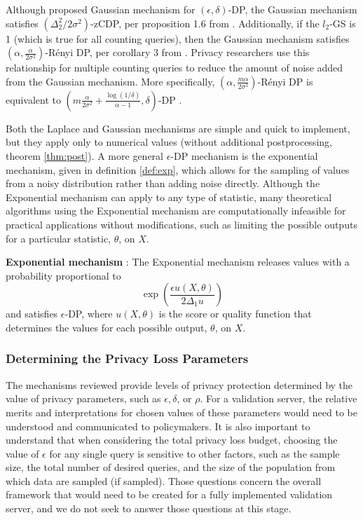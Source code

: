 Although \citet{dwork2014algorithmic} proposed Gaussian mechanism for $(\epsilon,\delta)$-DP, the Gaussian mechanism satisfies $(\Delta^2_2/2\sigma^2)$-zCDP, per proposition 1.6 from \citet{bun2016concentrated}. Additionally, if the $l_2$-GS is 1 (which is true for all counting queries), then the Gaussian mechanism satisfies $\left(\alpha, \frac{\alpha}{2\sigma^2}\right)$-R\'enyi DP, per corollary 3 from  \citet{mironov2017renyi}. Privacy researchers use this relationship for multiple counting queries to reduce the amount of noise added from the Gaussian mechanism. More specifically, $\left(\alpha, \frac{m\alpha}{2\sigma^2}\right)$-R\'enyi DP is equivalent to $\left(m\frac{\alpha}{2\sigma^2}+\frac{\log(1/\delta)}{\alpha-1}, \delta\right)$-DP \citep{mironov2017renyi,wang2019subsampled}.

Both the Laplace and Gaussian mechanisms are simple and quick to implement, but they apply only to numerical values (without additional postprocessing, theorem \ref{thm:post}). A more general $\epsilon$-DP mechanism is the exponential mechanism, given in definition \ref{def:exp}, which allows for the sampling of values from a noisy distribution rather than adding noise directly. Although the Exponential mechanism can apply to any type of statistic, many theoretical algorithms using the Exponential mechanism are computationally infeasible for practical applications without modifications, such as limiting the possible outputs for a particular statistic, $\theta$, on $X$.

\begin{defn}\label{def:exp} \textbf{Exponential mechanism} \citep{mcsherry2007mechanism}:
    The Exponential mechanism releases values with a probability proportional to
        \begin{equation}\label{eqn:exp}
            \exp \left(\frac{\epsilon u(X, \theta)}{2\Delta_1 u}\right)
        \end{equation}
    and satisfies $\epsilon$-DP, where $u(X,\theta)$ is the score or quality function that determines the values for each possible output, $\theta$, on $X$.
\end{defn}

\subsubsection{Determining the Privacy Loss Parameters}
The mechanisms reviewed provide levels of privacy protection determined by the value of privacy parameters, such as $\epsilon, \delta$, or $\rho$. For a validation server, the relative merits and interpretations for chosen values of these parameters would need to be understood and communicated to policymakers. It is also important to understand that when considering the total privacy loss budget, choosing the value of $\epsilon$ for any single query is sensitive to other factors, such as the sample size, the total number of desired queries, and the size of the population from which data are sampled (if sampled). Those questions concern the overall framework that would need to be created for a fully implemented validation server, and we do not seek to answer those questions at this stage.

